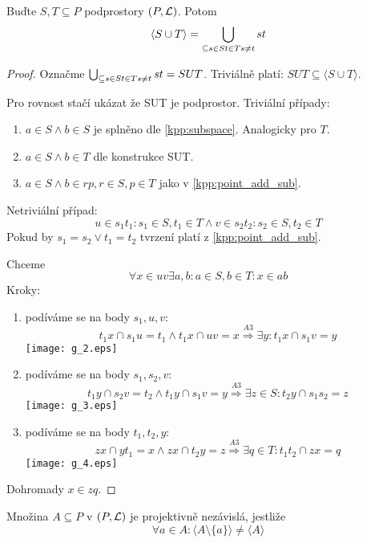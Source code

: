 \begin{lemma}
    Buďte $S,T \subseteq P$ podprostory $(P, \operatorname{\mathcal{L}})$.
    Potom
    \[ \langle S \cup T \rangle = \bigcup_{\subseteq{ s\in S \\ t\in T \\ s\neq t}} st \]
\end{lemma}
\begin{proof}
	Označme $\bigcup_{\subseteq{ s\in S \\ t\in T \\ s\neq t}} st = SUT$.
	Triviálně platí: $SUT \subseteq \langle S \cup T \rangle$.

	Pro rovnost stačí ukázat že SUT je podprostor.
	Triviální případy:
	\begin{enumerate}
		\item $a \in S \land b \in S$ je splněno dle \cref{kpp:subspace}.
			Analogicky pro $T$.
		\item $a \in S \land b \in T$ dle konstrukce SUT.
		\item $a \in S \land b \in rp, r \in S, p \in T$ jako v \cref{kpp:point_add_sub}.
	\end{enumerate}

	Netriviální případ:
	\[ u \in s_1t_1: s_1 \in S, t_1 \in T \land v \in s_2t_2: s_2 \in S, t_2 \in T \]
	Pokud by $s_1 = s_2 \lor t_1 = t_2$ tvrzení platí z \cref{kpp:point_add_sub}.

	Chceme
	\[ \forall x \in uv \exists a, b: a \in S, b \in T: x \in ab \]
	Kroky:
	\begin{enumerate}
		\item podíváme se na body $s_1, u, v$:
			\[ t_1x \cap s_1u = t_1 \land t_1x \cap uv = x \stackrel{A3}{\Rightarrow} \exists y: t_1x \cap s_1v = y \]
		\texttt{[image: g\_2.eps]}
	\item podíváme se na body $s_1, s_2, v$:
		\[ t_1y \cap s_2v = t_2 \land t_1y \cap s_1v = y \stackrel{A3}{\Rightarrow} \exists z \in S: t_2y \cap s_1s_2 = z \]
		\texttt{[image: g\_3.eps]}

	\item podíváme se na body $t_1, t_2, y$:
		\[ zx \cap yt_1 = x \land zx \cap t_2y = z \stackrel{A3}{\Rightarrow} \exists q \in T: t_1t_2 \cap zx = q \]
		\texttt{[image: g\_4.eps]}
	\end{enumerate}
	Dohromady $x \in zq$.
\end{proof}

\begin{definition}
    Množina $A\subseteq P$ v $(P,\operatorname{\mathcal{L}})$ je projektivně nezávislá, jestliže
    \[ \forall a\in A: \langle A\setminus \{a\}\rangle\neq\langle A \rangle \]
\end{definition}


